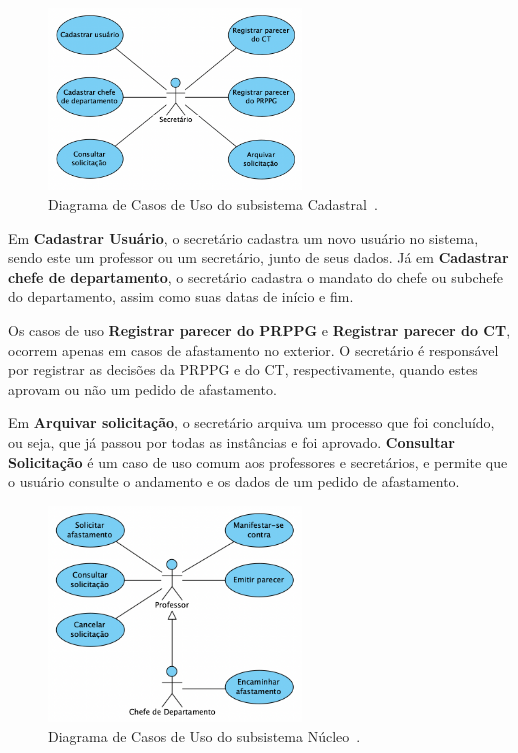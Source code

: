 \begin{figure}
    \centering
    \includegraphics[width=0.6\textwidth]{figuras/fig-caso-cadastral.png}
    \caption{Diagrama de Casos de Uso do subsistema Cadastral~\cite{prado:2015}.}
    \label{fig:casos-de-uso-cadastral}
\end{figure}

Em \textbf{Cadastrar Usuário}, o secretário cadastra um novo usuário no sistema, sendo
este um professor ou um secretário, junto de seus dados. Já em \textbf{Cadastrar chefe de departamento},
o secretário cadastra o mandato do chefe ou subchefe do departamento, assim como suas datas de início e fim.

Os casos de uso \textbf{Registrar parecer do PRPPG} e \textbf{Registrar parecer do CT}, ocorrem
apenas em casos de afastamento no exterior. O secretário é responsável por registrar as decisões
da PRPPG e do CT, respectivamente, quando estes aprovam ou não um pedido de afastamento.

Em \textbf{Arquivar solicitação}, o secretário arquiva um processo que foi concluído, ou seja, que
já passou por todas as instâncias e foi aprovado. \textbf{Consultar Solicitação} é um caso de uso
comum aos professores e secretários, e permite que o usuário consulte o andamento e os dados de um
pedido de afastamento.


\begin{figure}
    \centering
    \includegraphics[width=0.6\textwidth]{figuras/fig-caso-nucleo.png}
    \caption{Diagrama de Casos de Uso do subsistema Núcleo~\cite{prado:2015}.}
    \label{fig:casos-de-uso-nucleo}
\end{figure}


